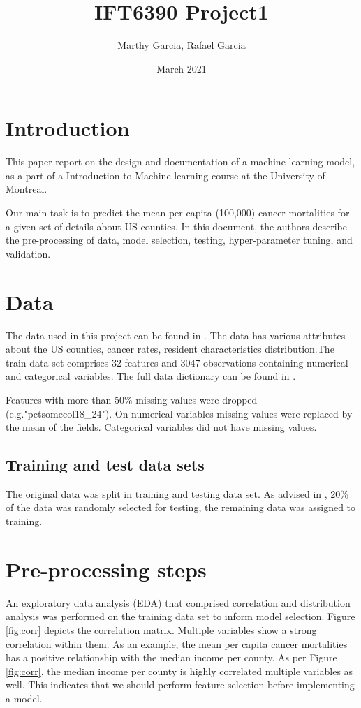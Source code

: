 \documentclass[twocolumn]{article}
\title{IFT6390 Project1}
\author{Marthy Garcia, Rafael Garcia}
\date{March 2021}
\begin{document}
\maketitle

\section{Introduction}
This paper report on the design and documentation of a machine learning model, as a part of a Introduction to Machine learning course at the University of Montreal. 

Our main task is to predict the mean per capita (100,000) cancer mortalities for a given set of details about US counties. In this document, the authors describe the pre-processing of data, model selection, testing, hyper-parameter tuning, and validation.

\section{Data } \label{secData}

The data used in this project can be found in \cite{bibdata}. The data has various attributes about the US counties, cancer rates, resident characteristics distribution.The train data-set comprises 32 features and 3047 observations containing numerical and categorical variables. The full data dictionary can be found in \cite{bibdatadict}.

Features with more than 50\% missing values were dropped (e.g."pctsomecol18\_24"). On numerical variables missing values were replaced by the mean of the fields. Categorical variables did not have missing values.

\subsection{Training and test data sets} \label{secsplit}
The original data was split in training and testing data set. As advised in \cite{bibDangeti2017},  20\% of the data was randomly selected for testing, the remaining data was assigned to training.

\section{Pre-processing steps} \label{secpre}
An exploratory data analysis (EDA) that comprised correlation and distribution analysis was performed on the training data set to inform model selection. Figure \ref{fig:corr} depicts the correlation matrix. Multiple variables show a strong correlation within them. As an example, the mean per capita cancer mortalities has a positive relationship with the median income per county. As per Figure \ref{fig:corr}, the median income per county is highly correlated multiple variables as well. This indicates that we should perform feature selection before implementing a model.
\end{document}
